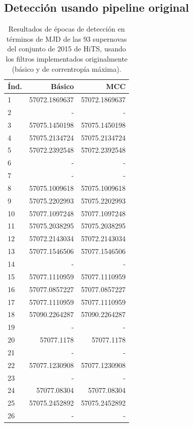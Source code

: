 \begin{appendix}
\section{Detecci\'on usando pipeline original}
\begin{table}[h!]
\small
\centering
\caption{Resultados de \'epocas de detecci\'on en t\'erminos de MJD de las 93 supernovas del conjunto de 2015 de HiTS, usando los filtros implementados originalmente (b\'asico y de correntrop\'ia m\'axima).}
\begin{tabular}{|l|r|r|}
\hline
\textbf{\'Ind.} & \textbf{B\'asico} & \textbf{MCC}   \\
\hline
1&57072.1869637 & 57072.1869637 \\
2&-             & -             \\
3&57075.1450198 & 57075.1450198 \\
4&57075.2134724 & 57075.2134724 \\
5&57072.2392548 & 57072.2392548 \\
6&-             & -             \\
7&-             & -             \\
8&57075.1009618 & 57075.1009618 \\
9&57075.2202993 & 57075.2202993 \\
10&57077.1097248 & 57077.1097248 \\
11&57075.2038295 & 57075.2038295 \\
12&57072.2143034 & 57072.2143034 \\
13&57077.1546506 & 57077.1546506 \\
14&-             & -             \\
15&57077.1110959 & 57077.1110959 \\
16&57077.0857227 & 57077.0857227 \\
17&57077.1110959 & 57077.1110959 \\
18&57090.2264287 & 57090.2264287 \\
19&-             & -             \\
20&57077.1178    & 57077.1178    \\
21&-             & -             \\
22&57077.1230908 & 57077.1230908 \\
23&-             & -             \\
24&57077.08304   & 57077.08304   \\
25&57075.2452892 & 57075.2452892 \\
26&-             & -             \\

\end{tabular}
\end{table}
\end{appendix}
